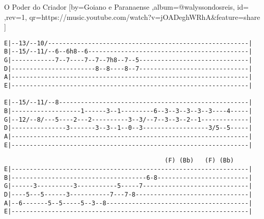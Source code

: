 \beginsong
{O Poder do Criador %
}[by={Goiano e Paranaense %
},album={@walyssondosreis},
id={ %
},rev={1}, %
qr={https://music.youtube.com/watch?v=jOADeghWRhA&feature=share %
}]
\lstset{basicstyle=\scriptsize\bf} %
\begin{lstlisting}
E|--13/--10/-------------------------------------------------------|
B|--15/--11/--6--6h8--6--------------------------------------------|
G|------------7--7----7--7--7h8--7--5------------------------------|
D|-----------------------8--8----8--7------------------------------|
A|-----------------------------------------------------------------|
E|-----------------------------------------------------------------|

E|--15/--11/--8----------------------------------------------------|
B|-------------------1------3--1---------6--3--3--3--3--3----4-----|
G|--12/--8/---5----2---2----------3--3/--7--3--3--2--1-------------|
D|---------------3-------3--3--1--0--3------------------3/5--5-----|
A|-----------------------------------------------------------------|
E|-----------------------------------------------------------------|
\end{lstlisting}
\begin{lstlisting}
                                            (F) (Bb)   (F) (Bb)
E|-----------------------------------------------------------------|
B|-------------------------------------6-8-------------------------|
G|------3----------3-----------5-----7-----------------------------|
D|----5---5------3-----------7---7-8-------------------------------|
A|--6-------5--5-----5--3--8---------------------------------------|
E|-----------------------------------------------------------------|
\end{lstlisting}
\beginverse 
